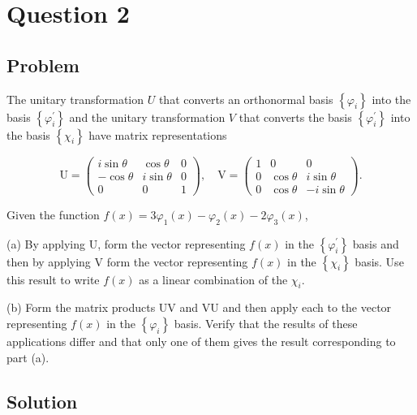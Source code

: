 \documentclass[12pt]{article}
\begin{document}
\newpage
\section{Question 2}

\subsection{Problem}

The unitary transformation \(U\) that converts an orthonormal basis \(\left\{\varphi_i\right\}\) into the basis \(\left\{\varphi_i^{\prime}\right\}\) and the unitary transformation \(V\) that converts the basis \(\left\{\varphi_i^{\prime}\right\}\) into the basis \(\left\{\chi_i\right\}\) have matrix representations

\[
    \mathrm{U}=\left(\begin{array}{ccc}
            i \sin \theta & \cos \theta   & 0 \\
            -\cos \theta  & i \sin \theta & 0 \\
            0             & 0             & 1
        \end{array}\right), \quad \mathrm{V}=\left(\begin{array}{ccc}
            1 & 0           & 0              \\
            0 & \cos \theta & i \sin \theta  \\
            0 & \cos \theta & -i \sin \theta
        \end{array}\right) .
\]

Given the function \(f(x)=3 \varphi_1(x)-\varphi_2(x)-2 \varphi_3(x)\),

(a) By applying \(\mathrm{U}\), form the vector representing \(f(x)\) in the \(\left\{\varphi_i^{\prime}\right\}\) basis and then by applying \(\mathrm{V}\) form the vector representing \(f(x)\) in the \(\left\{\chi_i\right\}\) basis. Use this result to write \(f(x)\) as a linear combination of the \(\chi_i\).

(b) Form the matrix products UV and VU and then apply each to the vector representing \(f(x)\) in the \(\left\{\varphi_i\right\}\) basis. Verify that the results of these applications differ and that only one of them gives the result corresponding to part (a).

\subsection{Solution}
\end{document}
